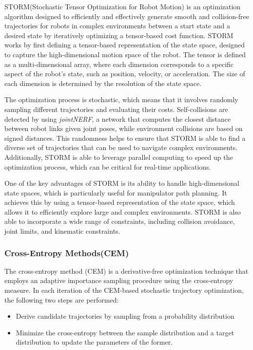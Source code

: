 STORM(Stochastic Tensor Optimization for Robot Motion)\cite{STORM} is an optimization algorithm designed to efficiently and effectively generate smooth and collision-free trajectories for robots in complex environments between a start state and a desired state by iteratively optimizing a tensor-based cost function. STORM works by first defining a tensor-based representation of the state space, designed to capture the high-dimensional motion space of the robot. The tensor is defined as a multi-dimensional array, where each dimension corresponds to a specific aspect of the robot's state, such as position, velocity, or acceleration. The size of each dimension is determined by the resolution of the state space.

The optimization process is stochastic, which means that it involves randomly sampling different trajectories and evaluating their costs. Self-collisions are detected by using \textit{jointNERF}, a network that computes the closest distance between robot links given joint poses, while environment collisions are based on signed distances. This randomness helps to ensure that STORM is able to find a diverse set of trajectories that can be used to navigate complex environments. Additionally, STORM is able to leverage parallel computing to speed up the optimization process, which can be critical for real-time applications.

One of the key advantages of STORM is its ability to handle high-dimensional state spaces, which is particularly useful for manipulator path planning. It achieves this by using a tensor-based representation of the state space, which allows it to efficiently explore large and complex environments. STORM is also able to incorporate a wide range of constraints, including collision avoidance, joint limits, and kinematic constraints.

\subsubsection{Cross-Entropy Methods(CEM)}

The cross-entropy method (CEM)\cite{CEM_og} is a derivative-free optimization technique that employs an adaptive importance sampling procedure using the cross-entropy measure. In each iteration of the CEM-based stochastic trajectory optimization, the following two steps are performed:

\begin{itemize}
    \item Derive candidate trajectories by sampling from a probability distribution
    \item Minimize the cross-entropy between the sample distribution and a target distribution to update the parameters of the former.
\end{itemize}

